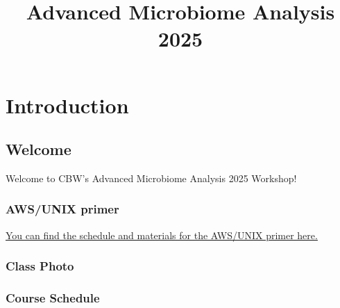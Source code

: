 \documentclass[
]{book}
\title{Advanced Microbiome Analysis 2025}
\author{}
\date{\vspace{-2.5em}}
\begin{document}
\maketitle

{
\setcounter{tocdepth}{1}
\tableofcontents
}
\part{Introduction}\label{part-introduction}

\chapter{Welcome}\label{welcome}

Welcome to CBW's Advanced Microbiome Analysis 2025 Workshop!

\section{AWS/UNIX primer}\label{awsunix-primer}

\href{https://bioinformaticsdotca.github.io/AWS_2025}{You can find the schedule and materials for the AWS/UNIX primer here.}

\section{Class Photo}\label{class-photo}

\section{Course Schedule}\label{course-schedule}
\end{document}
